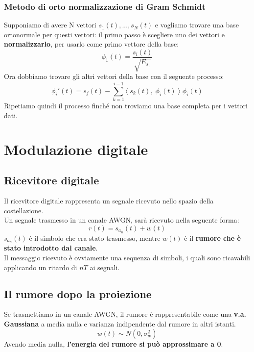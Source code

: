 \documentclass{article}
\begin{document}
\subsubsection{Metodo di orto normalizzazione di Gram Schmidt}
Supponiamo di avere N vettori $s_1(t),...,s_N(t)$ e vogliamo trovare una base ortonormale per questi vettori: il primo passo è scegliere uno dei vettori e \textbf{normalizzarlo}, per usarlo come primo vettore della base:
$$\phi_1(t)=\frac{s_i(t)}{\sqrt{E_{s_1}}}$$
Ora dobbiamo trovare gli altri vettori della base con il seguente processo:
$$\phi_i'(t)=s_j(t)-\sum_{k=1}^{i-1}\langle\;s_k(t),\;\phi_i(t)\;\rangle\;\phi_i(t)$$
Ripetiamo quindi il processo finché non troviamo una base completa per i vettori dati.









\newpage
\section{Modulazione digitale}

\subsection{Ricevitore digitale}
Il ricevitore digitale rappresenta un segnale ricevuto nello spazio della costellazione.\\
Un segnale trasmesso in un canale AWGN, sarà ricevuto nella seguente forma:
$$r(t)=s_{a_n}(t)+w(t)$$
$s_{a_n}(t)$ è il simbolo che era stato trasmesso, mentre $w(t)$ è il \textbf{rumore che è stato introdotto dal canale}.\\
Il messaggio ricevuto è ovviamente una sequenza di simboli, i quali sono ricavabili applicando un ritardo di $nT$ ai segnali.

\subsection{Il rumore dopo la proiezione}
Se trasmettiamo in un canale AWGN, il rumore è rappresentabile come una \textbf{v.a. Gaussiana} a media nulla e varianza indipendente dal rumore in altri istanti.
$$w(t)\sim N(0,\sigma_w^2)$$
Avendo media nulla, \textbf{l'energia del rumore si può approssimare a 0}.\\
\end{document}
